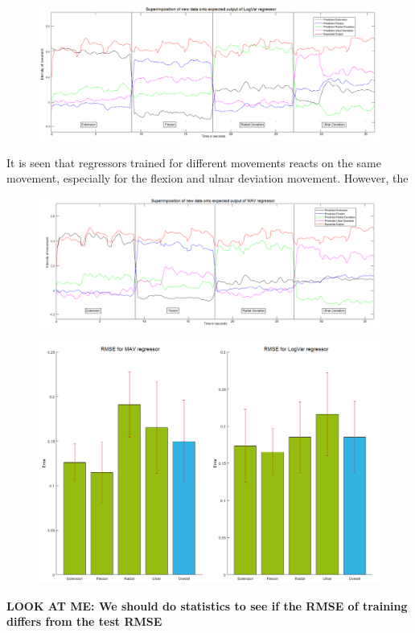 \begin{figure}[H]
	\includegraphics[width=1\textwidth]{figures/results/SuperPoisonLogVarNewData}  %
	\caption{}
	\label{fig:SuperPoisonLogVarNewData}  %
\end{figure}

It is seen that regressors trained for different movements reacts on the same movement, especially for the flexion and ulnar deviation movement. However, the 

\begin{figure}[H]
	\includegraphics[width=1\textwidth]{figures/results/SuperPoisonMavNewData}  %
	\caption{}
	\label{fig:SuperPoisonMavNewData}  %
\end{figure}


\begin{figure}[H]
	\includegraphics[width=1\textwidth]{figures/results/RMSEBarPlotNewData}  %
	\caption{}
	\label{fig:RMSEBarPlotNewData}  %
\end{figure}


\textbf{LOOK AT ME: We should do statistics to see if the RMSE of training differs from the test RMSE}